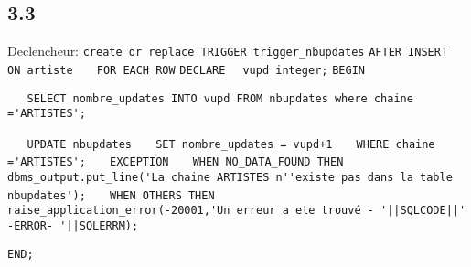 \documentclass{article}
\begin{document}
\subsection{3.3}

Declencheur:
\verb!create or replace TRIGGER trigger_nbupdates! 
\verb!AFTER INSERT! 
\verb!   ON artiste! 
\verb!   FOR EACH ROW! 
\verb!DECLARE! 
\verb!  vupd integer;! 
\verb!BEGIN! 

\verb!   SELECT nombre_updates INTO vupd FROM nbupdates where chaine ='ARTISTES';! 
   
\verb!   UPDATE nbupdates! 
\verb!   SET nombre_updates = vupd+1! 
\verb!   WHERE chaine ='ARTISTES';! 
\verb!   EXCEPTION! 
\verb!   WHEN NO_DATA_FOUND THEN! 
\verb!      dbms_output.put_line('La chaine ARTISTES n''existe pas dans la table nbupdates');! 
\verb!   WHEN OTHERS THEN! 
\verb!      raise_application_error(-20001,'Un erreur a ete trouvé - '||SQLCODE||' -ERROR- '||SQLERRM);! 

\verb!END;! 
\end{document}
